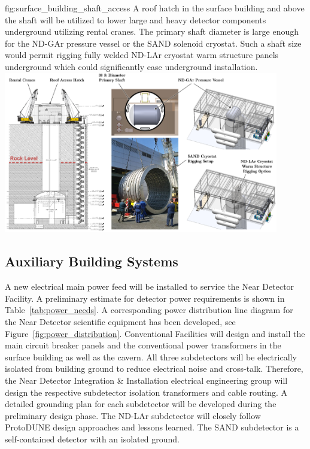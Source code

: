 \begin{dunefigure}{fig:surface_building_shaft_access}
{A roof hatch in the surface building and above the shaft will be utilized to lower large and heavy detector components underground utilizing rental cranes. The primary shaft diameter is large enough for the ND-GAr pressure vessel or the SAND solenoid cryostat. Such a shaft size would permit rigging fully welded ND-LAr cryostat warm structure panels underground which could significantly ease underground installation.}
\includegraphics[width=0.9\textwidth]{graphics/i-and-i/surface_building_shaft_access}
\end{dunefigure}

\subsection{Auxiliary Building Systems}
\label{sec:chap-id:facility:additional}


A new electrical main power feed will be installed to service the Near Detector Facility. A preliminary estimate for detector power requirements is shown in Table~\ref{tab:power_needs}. A corresponding power distribution line diagram for the Near Detector scientific equipment has been developed, see Figure~\ref{fig:power_distribution}. Conventional Facilities will design and install the main circuit breaker panels and the conventional power transformers in the surface building as well as the cavern. All three subdetectors will be electrically isolated from building ground to reduce electrical noise and cross-talk. Therefore, the Near Detector Integration \& Installation electrical engineering group will design the respective subdetector isolation transformers and cable routing. A detailed grounding plan for each subdetector will be developed during the preliminary design phase. The ND-LAr subdetector will closely follow ProtoDUNE design approaches and lessons learned. The SAND subdetector is a self-contained detector with an isolated ground.

